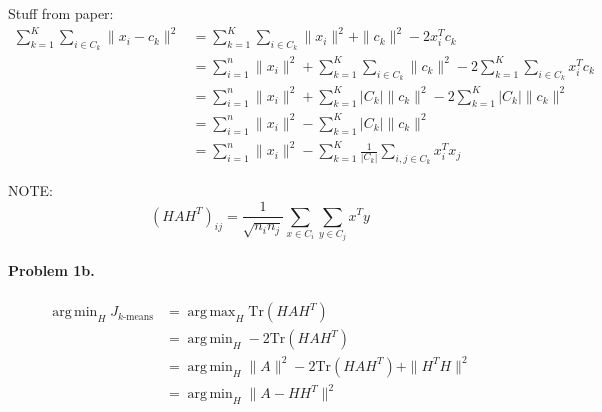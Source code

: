 \documentclass[12pt]{article}
\newcommand{\Tr}{\mathrm{Tr}}
\DeclareMathOperator*{\argmax}{arg\,max}
\DeclareMathOperator*{\argmin}{arg\,min}
\begin{document}
Stuff from paper:
\begin{align*}
\sum_{k=1}^K \sum_{i \in C_k} \|x_i - c_k\|^2 &= \sum_{k=1}^K \sum_{i \in C_k} \|x_i\|^2 + \|c_k\|^2 - 2x_i^T c_k \\
&= \sum_{i=1}^n \|x_i\|^2 + \sum_{k=1}^K \sum_{i \in C_k} \|c_k\|^2 - 2 \sum_{k=1}^K \sum_{i \in C_k} x_i^T c_k \\
&= \sum_{i=1}^n \|x_i\|^2 + \sum_{k=1}^K |C_k| \|c_k\|^2 - 2 \sum_{k=1}^K |C_k| \|c_k\|^2 \\
&= \sum_{i=1}^n \|x_i\|^2 - \sum_{k=1}^K |C_k|\|c_k\|^2\\
&= \sum_{i=1}^n \|x_i\|^2 - \sum_{k=1}^K \frac{1}{|C_k|} \sum_{i, j \in C_k} x_i^T x_j
\end{align*}

NOTE: \[(HAH^T)_{ij} =  \frac{1}{\sqrt{n_i n_j}} \sum_{x \in C_i}\sum_{y \in C_j} x^T y \]

\paragraph{Problem 1b.}
\begin{align*}
\argmin_{H} J_{k\text{-means}} &= \argmax_H \Tr(HAH^T) \\
&= \argmin_H -2\Tr(HAH^T) \\
&= \argmin_H \|A\|^2 -2 \Tr(HAH^T) + \|H^TH\|^2 \\
&= \argmin_H \|A - HH^T\|^2
\end{align*}
\end{document}
